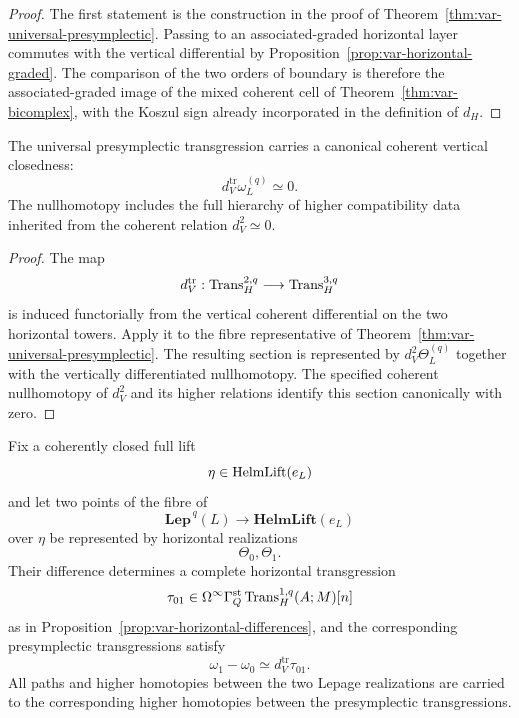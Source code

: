 \begin{proof}
The first statement is the construction in the proof of Theorem~\ref{thm:var-universal-presymplectic}.  Passing to an associated-graded horizontal layer commutes with the vertical differential by Proposition~\ref{prop:var-horizontal-graded}.  The comparison of the two orders of boundary is therefore the associated-graded image of the mixed coherent cell of Theorem~\ref{thm:var-bicomplex}, with the Koszul sign already incorporated in the definition of \(d_H\).
\end{proof}

\begin{proposition}
\label{prop:var-presymplectic-vertical-closed}
The universal presymplectic transgression carries a canonical coherent vertical closedness:
\[
    \boxed{
    d_V^{\mathrm{tr}}\omega_L^{(q)}
    \simeq0.
    }
\]
The nullhomotopy includes the full hierarchy of higher compatibility data inherited from the coherent relation \(d_V^2\simeq0\).
\end{proposition}

\begin{proof}
The map
\[
    d_V^{\mathrm{tr}}:
    \operatorname{Trans}_{H}^{2,q}\longrightarrow\operatorname{Trans}_{H}^{3,q}
\]
is induced functorially from the vertical coherent differential on the two horizontal towers.  Apply it to the fibre representative of Theorem~\ref{thm:var-universal-presymplectic}.  The resulting section is represented by \(d_V^2\Theta_L^{(q)}\) together with the vertically differentiated nullhomotopy.  The specified coherent nullhomotopy of \(d_V^2\) and its higher relations identify this section canonically with zero.
\end{proof}

\begin{proposition}
\label{prop:var-presymplectic-change}
Fix a coherently closed full lift
\[
    \eta\in\operatorname{HelmLift}(e_L)
\]
and let two points of the fibre of
\[
    \mathbf{Lep}^{\,q}(L)\longrightarrow\mathbf{HelmLift}(e_L)
\]
over \(\eta\) be represented by horizontal realizations
\[
    \Theta_0,\Theta_1.
\]
Their difference determines a complete horizontal transgression
\[
    \tau_{01}\in
    \Omega^\infty\Gamma_Q^{\mathrm{st}}\operatorname{Trans}_{H}^{1,q}(A;M)[n]
\]
as in Proposition~\ref{prop:var-horizontal-differences}, and the corresponding presymplectic transgressions satisfy
\[
    \boxed{
    \omega_1-\omega_0
    \simeq
    d_V^{\mathrm{tr}}\tau_{01}.
    }
\]
All paths and higher homotopies between the two Lepage realizations are carried to the corresponding higher homotopies between the presymplectic transgressions.
\end{proposition}

